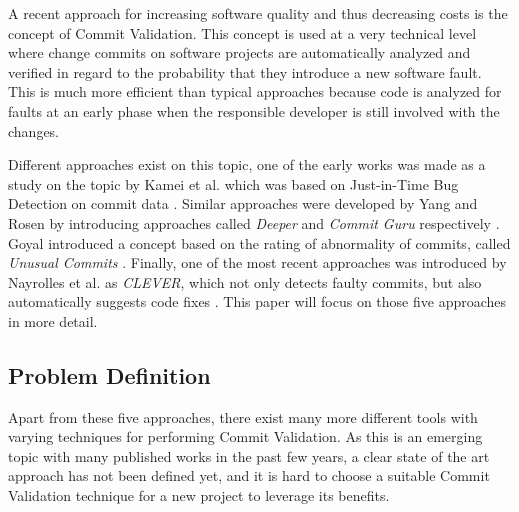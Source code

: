 A recent approach for increasing software quality and thus decreasing costs is the concept of Commit Validation. This concept is used at a very technical level where change commits on software projects are automatically analyzed and verified in regard to the probability that they introduce a new software fault. This is much more efficient than typical approaches because code is analyzed for faults at an early phase when the responsible developer is still involved with the changes. \cite{Kamei2013}

Different approaches exist on this topic,
one of the early works was made as a study on the topic by Kamei et al. which was based on Just-in-Time Bug Detection on commit data \cite{Kamei2013}. Similar approaches were developed by Yang and Rosen by introducing approaches called \textit{Deeper} and \textit{Commit Guru} respectively \cite{Yang2015,Rosen2015}. Goyal introduced a concept based on the rating of abnormality of commits, called \textit{Unusual Commits} \cite{Goyal2017}. Finally, one of the most recent approaches was introduced by Nayrolles et al. as \textit{CLEVER}, which not only detects faulty commits, but also automatically suggests code fixes \cite{Nayrolles2018}. This paper will focus on those five approaches in more detail.

\subsection{Problem Definition}

Apart from these five approaches, there exist many more different tools with varying techniques for performing Commit Validation.
As this is an emerging topic with many published works in the past few years, a clear state of the art approach has not been defined yet, and it is hard to choose a suitable Commit Validation technique for a new project to leverage its benefits. 

